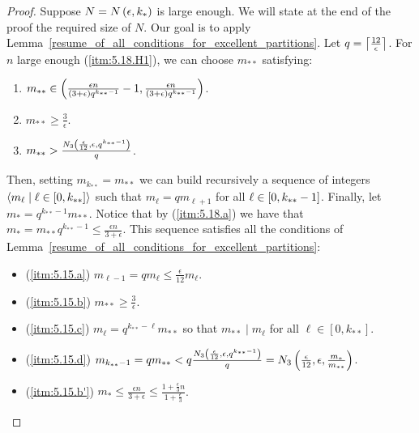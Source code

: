         \begin{proof}
            Suppose $N = N\left( \epsilon, k_* \right)$ is large enough.
            We will state at the end of the proof the required size of $N$.
            Our goal is to apply Lemma~\ref{resume_of_all_conditions_for_excellent_partitions}.
            Let $q = \left\lceil \frac{12}{\epsilon} \right\rceil$.
            For $n$ large enough (\ref{itm:5.18.H1}), we can choose $m_{**}$ satisfying:
            \begin{enumerate}[label=(\alph*), ref=\alph*]
                \item \label{itm:5.18.a} $m_{**} \in \left( \frac{\epsilon n}{\left( 3 + \epsilon \right) q^{k_{**}-1}} - 1,
                    \frac{\epsilon n}{\left( 3 + \epsilon \right) q^{k_{**}-1}} \right)$.
                \item \label{itm:5.18.b} $m_{**} \geq \frac{3}{\epsilon}$.
                \item \label{itm:5.18.c} $m_{**} > \frac{N_3\left( \frac{\epsilon}{12}, \epsilon, q^{k_{**}-1} \right)}{q}$.
            \end{enumerate}
            Then, setting $m_{k_{**}} = m_{**}$ we can build recursively a sequence of integers
            $\left< m_\ell \mid \ell \in [0, k_{**}] \right>$ such that $m_\ell = q m_{\ell + 1}$ for all
            $\ell \in \left[ 0, k_{**}-1 \right]$.
            Finally, let $m_* = q^{k_{**}-1} m_{**}$.
            Notice that by (\ref{itm:5.18.a}) we have that $m_* = m_{**} q^{k_{**}-1} \leq \frac{\epsilon n}{3 + \epsilon}$.
            This sequence satisfies all the conditions of Lemma~\ref{resume_of_all_conditions_for_excellent_partitions}:
            \begin{itemize}[label={}]
                \item (\ref{itm:5.15.a}) $m_{\ell-1} = q m_\ell \leq \frac{\epsilon}{12} m_\ell$.
                \item (\ref{itm:5.15.b}) $m_{**} \geq \frac{3}{\epsilon}$.
                \item (\ref{itm:5.15.c}) $m_\ell = q^{k_{**}-\ell} m_{**}$ so that $m_{**} \mid m_\ell$ for all $\ell \in [0, k_{**}]$.
                \item (\ref{itm:5.15.d}) $m_{k_{**}-1} = q m_{**} < q \frac{N_3\left( \frac{\epsilon}{12}, \epsilon, q^{k_{**}-1} \right)}{q}
                    = N_3\left( \frac{\epsilon}{12}, \epsilon, \frac{m_*}{m_{**}} \right)$.
                \item (\ref{itm:5.15.b'}) $m_* \leq \frac{\epsilon n}{3 + \epsilon} \leq \frac{1 + \frac{\epsilon}{3}n}{1 + \frac{\epsilon}{3}}$.

\end{itemize}
\end{proof}
